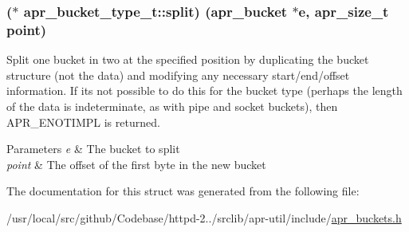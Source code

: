 \subsubsection[{\texorpdfstring{split}{split}}]{($\ast$ apr\+\_\+bucket\+\_\+type\+\_\+t\+::split) ({\bf apr\+\_\+bucket} $\ast${\bf e}, {\bf apr\+\_\+size\+\_\+t} {\bf point})}\hypertarget{structapr__bucket__type__t_a2281bf6b0c4538d29567fc7ddb1ad085}{}\label{structapr__bucket__type__t_a2281bf6b0c4538d29567fc7ddb1ad085}
Split one bucket in two at the specified position by duplicating the bucket structure (not the data) and modifying any necessary start/end/offset information. If it\textquotesingle{}s not possible to do this for the bucket type (perhaps the length of the data is indeterminate, as with pipe and socket buckets), then A\+P\+R\+\_\+\+E\+N\+O\+T\+I\+M\+PL is returned. 
\begin{DoxyParams}{Parameters}
{\em e} & The bucket to split \\
\hline
{\em point} & The offset of the first byte in the new bucket \\
\hline
\end{DoxyParams}


The documentation for this struct was generated from the following file\+:\begin{DoxyCompactItemize}
\item 
/usr/local/src/github/\+Codebase/httpd-\/2../srclib/apr-\/util/include/\hyperlink{apr__buckets_8h}{apr\+\_\+buckets.\+h}\end{DoxyCompactItemize}
